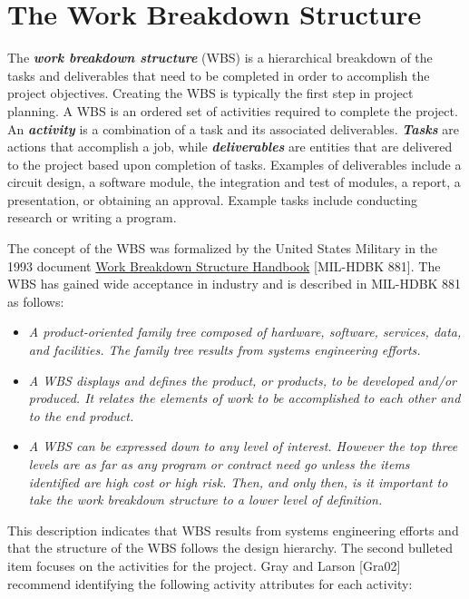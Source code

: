 \section{The Work Breakdown Structure}
\label{section:the-work-breakdown-structure}

The \emph{\textbf{work breakdown structure}} (WBS) is a hierarchical
breakdown of the tasks and deliverables that need to be completed in
order to accomplish the project objectives. Creating the WBS is
typically the first step in project planning. A WBS is an ordered set of
activities required to complete the project. An \emph{\textbf{activity}}
is a combination of a task and its associated deliverables.
\emph{\textbf{Tasks}} are actions that accomplish a job, while
\emph{\textbf{deliverables}} are entities that are delivered to the
project based upon completion of tasks. Examples of deliverables include
a circuit design, a software module, the integration and test of
modules, a report, a presentation, or obtaining an approval. Example
tasks include conducting research or writing a program.

The concept of the WBS was formalized by the United States Military in
the 1993 document \ul{Work Breakdown Structure Handbook} {[}MIL-HDBK
881{]}. The WBS has gained wide acceptance in industry and is described
in MIL-HDBK 881 as follows:

\begin{itemize}
\item
  \emph{A product-oriented family tree composed of hardware, software,
  services, data, and facilities. The family tree results from systems
  engineering efforts.}
\item
  \emph{A WBS displays and defines the product, or products, to be
  developed and/or produced. It relates the elements of work to be
  accomplished to each other and to the end product.}
\item
  \emph{A WBS can be expressed down to any level of interest. However
  the top three levels are as far as any program or contract need go
  unless the items identified are high cost or high risk. Then, and only
  then, is it important to take the work breakdown structure to a lower
  level of definition.}
\end{itemize}

This description indicates that WBS results from systems engineering
efforts and that the structure of the WBS follows the design hierarchy.
The second bulleted item focuses on the activities for the project. Gray
and Larson {[}Gra02{]} recommend identifying the following activity
attributes for each activity:

